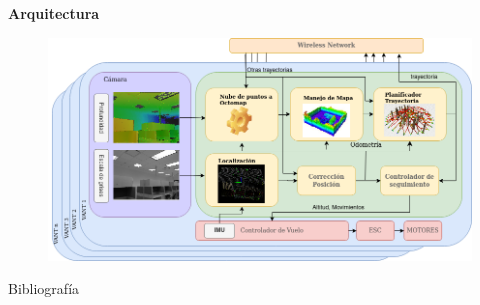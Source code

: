 \documentclass[
  24pt, %
  aspectratio=169, %
]{beamer}
\begin{document}
\begin{frame}
  \textbf{Arquitectura}
  \begin{figure}
    \centering
    \includegraphics[width=15cm]{arquitectura}
  \end{figure}
\end{frame}


\begin{frame}{Bibliografía}
  \tiny
  
  
\end{frame}
\end{document}
